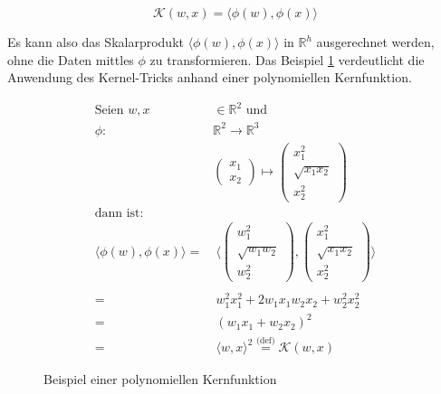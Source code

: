 \begin{equation}
\label{eq:svm_kern_trick}
    \mathcal{K}(w,x) = \langle\phi(w),\phi(x)\rangle
\end{equation}

Es kann also das Skalarprodukt $\langle\phi(w),\phi(x)\rangle$ in $\mathbb{R}^h$ ausgerechnet werden, ohne die Daten mittles $\phi$ zu transformieren. 
Das Beispiel \ref{fig:ex_kernel} verdeutlicht die Anwendung des Kernel-Tricks  anhand einer polynomiellen Kernfunktion.

\renewcommand{\figurename}{Bsp.}
\begin{figure}[htbp]
\begin{equation*}
\label{eq:svm_kernel_example}
\begin{split}
    \text{Seien } w,x & \in \mathbb{R}^2 \text{ und}\\
    \phi : & \mathbb{R}^2 \to \mathbb{R}^3\\
    & \begin{pmatrix}
    x_1 \\
    x_2
    \end{pmatrix}
    \mapsto
    \begin{pmatrix}
    x_1^2 \\
    \sqrt{x_1x_2} \\
    x_2^2
    \end{pmatrix}\\
    \text{dann ist:} &\\
    \langle \phi(w),\phi(x) \rangle = & \:\langle \begin{pmatrix}
    w_1^2 \\
    \sqrt{w_1w_2} \\
    w_2^2
    \end{pmatrix},
    \begin{pmatrix}
    x_1^2 \\
    \sqrt{x_1x_2} \\
    x_2^2
    \end{pmatrix} \rangle \\
    \\
    = & \:w_1^2x_1^2 + 2 w_1x_1w_2x_2 + w_2^2x_2^2 \\
    = & \:(w_1x_1 + w_2x_2)^2 \\
    = & \:\langle w,x \rangle^2 \overset{\text{(def)}}= \mathcal{K}(w,x)
\end{split}
\end{equation*}
    \caption{Beispiel einer polynomiellen Kernfunktion}
    \label{fig:ex_kernel}
\end{figure}

